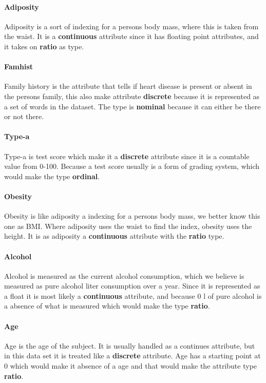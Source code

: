 \paragraph{Adiposity} Adiposity is a sort of indexing for a persons body mass, where this is taken from the waist. It is a \textbf{continuous} attribute since it has floating point attributes, and it takes on \textbf{ratio} as type.

\paragraph{Famhist} Family history is the attribute that tells if heart disease is present or absent in the persons family, this also make attribute \textbf{discrete} because it is represented as a set of words in the dataset. The type is \textbf{nominal} because it can either be there or not there.

\paragraph{Type-a} Type-a is test score which make it a \textbf{discrete} attribute since it is a countable value from 0-100. Because a test score usually is a form of grading system, which would make the type \textbf{ordinal}.

\paragraph{Obesity} Obesity is like adiposity a indexing for a persons body mass, we better know this one as BMI. Where adiposity uses the waist to find the index, obesity uses the height. It is as adiposity a \textbf{continuous} attribute with the \textbf{ratio} type.

\paragraph{Alcohol} Alcohol is measured as the current alcohol consumption, which we believe is measured as pure alcohol liter consumption over a year. Since it is represented as a float it is most likely a \textbf{continuous} attribute, and because 0 l of pure alcohol is a absence of what is measured which would make the type \textbf{ratio}.

\paragraph{Age} Age is the age of the subject. It is usually handled as a continues attribute, but in this data set it is treated like a \textbf{discrete} attribute. Age has a starting point at 0 which would make it absence of a age and that would make the attribute type \textbf{ratio}.

